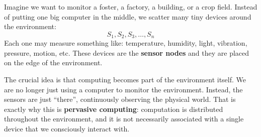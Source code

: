 \highspace
\begin{examplebox}
    Imagine we want to monitor a foster, a factory, a building, or a crop field. Instead of putting one big computer in the middle, we scatter many tiny devices around the environment:
    \begin{equation*}
        S_1, S_2, S_3, \dots, S_n
    \end{equation*}
    Each one may measure something like: temperature, humidity, light, vibration, pressure, motion, etc. These devices are the \textbf{sensor nodes} and they are placed on the edge of the environment.

    \highspace
    The crucial idea is that computing becomes part of the environment itself. We are no longer just using a computer to monitor the environment. Instead, the sensors are just ``there'', continuously observing the physical world. That is exactly why this is \textbf{pervasive computing}: computation is distributed throughout the environment, and it is not necessarily associated with a single device that we consciously interact with.


\end{examplebox}
